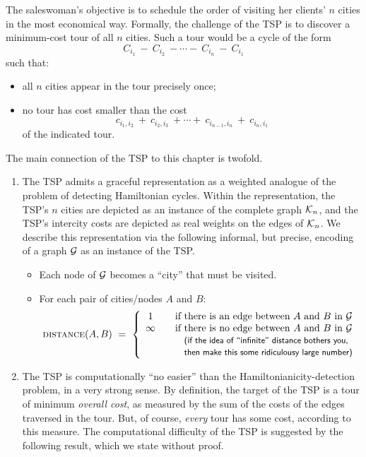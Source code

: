 The saleswoman's objective is to schedule the order of visiting her
clients' $n$ cities in the most economical way.  Formally, the
challenge of the TSP is to discover a minimum-cost tour of all $n$
cities.  Such a tour would be a cycle of the form
\[ C_{i_1} \ - \ C_{i_2} \ - \cdots - \ C_{i_n} \ - \ C_{i_1} \]
such that:
\begin{itemize}
\item
all $n$ cities appear in the tour precisely once;
\item
no tour has cost smaller than the cost
\[ c_{i_1,i_2} \ + \ c_{i_2, i_3} \ + \cdots + \  
c_{i_{n-1}, i_n} \ + \ c_{i_n, i_1} \]
of the indicated tour.
\end{itemize}
The main connection of the TSP to this chapter is twofold.
\begin{enumerate}
\item
The TSP admits a graceful representation as a weighted analogue of the
problem of detecting Hamiltonian cycles.  Within the representation,
the TSP's $n$ cities are depicted as an instance of the complete graph
$\mbox{$\cal K$}_n$, and the TSP's intercity costs are depicted as real weights on
the edges of $\mbox{$\cal K$}_n$.  We describe this representation via the
following informal, but precise, encoding of a graph $\mbox{$\cal G$}$ as an
instance of the TSP.
  \begin{itemize}
  \item
Each node of $\mbox{$\cal G$}$ becomes a ``city'' that must be visited.
  \item
For each pair of cities/nodes $A$ and $B$:
\[ \mbox{\sc distance}(A,B) \ = \ \left\{
\begin{array}{ccl}
1 & & \mbox{if there is an edge between $A$ and $B$ in $\g$} \\
\infty & & \mbox{if there is no edge between $A$ and $B$ in $\g$} \\
       & & \mbox{\small\sf (if the idea of ``infinite'' distance bothers you,} \\
       & & \mbox{\small\sf then make this some ridiculousy large number)}
\end{array}
\right.
\]
  \end{itemize}

\item
The TSP is computationally ``no easier'' than the
Hamiltonianicity-detection problem, in a very strong sense.  By
definition, the target of the TSP is a tour of minimum {\em overall
  cost}, as measured by the sum of the costs of the edges traversed in
the tour.  But, of course, {\em every} tour has some cost, according
to this measure.  The computational difficulty of the TSP is suggested
by the following result, which we state without proof.
\end{enumerate}

